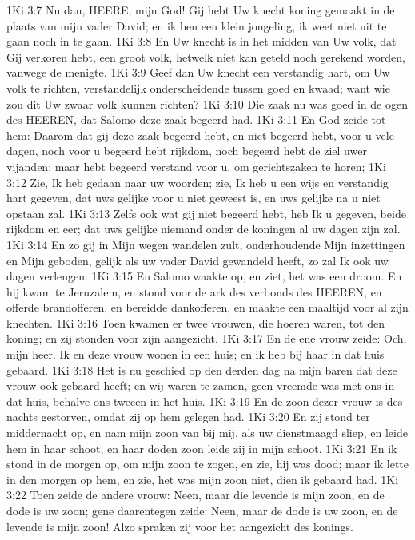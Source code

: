 1Ki 3:7  Nu dan, HEERE, mijn God! Gij hebt Uw knecht koning gemaakt in de plaats van mijn vader David; en ik ben een klein jongeling, ik weet niet uit te gaan noch in te gaan.
1Ki 3:8  En Uw knecht is in het midden van Uw volk, dat Gij verkoren hebt, een groot volk, hetwelk niet kan geteld noch gerekend worden, vanwege de menigte.
1Ki 3:9  Geef dan Uw knecht een verstandig hart, om Uw volk te richten, verstandelijk onderscheidende tussen goed en kwaad; want wie zou dit Uw zwaar volk kunnen richten?
1Ki 3:10  Die zaak nu was goed in de ogen des HEEREN, dat Salomo deze zaak begeerd had.
1Ki 3:11  En God zeide tot hem: Daarom dat gij deze zaak begeerd hebt, en niet begeerd hebt, voor u vele dagen, noch voor u begeerd hebt rijkdom, noch begeerd hebt de ziel uwer vijanden; maar hebt begeerd verstand voor u, om gerichtszaken te horen;
1Ki 3:12  Zie, Ik heb gedaan naar uw woorden; zie, Ik heb u een wijs en verstandig hart gegeven, dat uws gelijke voor u niet geweest is, en uws gelijke na u niet opstaan zal.
1Ki 3:13  Zelfs ook wat gij niet begeerd hebt, heb Ik u gegeven, beide rijkdom en eer; dat uws gelijke niemand onder de koningen al uw dagen zijn zal.
1Ki 3:14  En zo gij in Mijn wegen wandelen zult, onderhoudende Mijn inzettingen en Mijn geboden, gelijk als uw vader David gewandeld heeft, zo zal Ik ook uw dagen verlengen.
1Ki 3:15  En Salomo waakte op, en ziet, het was een droom. En hij kwam te Jeruzalem, en stond voor de ark des verbonds des HEEREN, en offerde brandofferen, en bereidde dankofferen, en maakte een maaltijd voor al zijn knechten.
1Ki 3:16  Toen kwamen er twee vrouwen, die hoeren waren, tot den koning; en zij stonden voor zijn aangezicht.
1Ki 3:17  En de ene vrouw zeide: Och, mijn heer. Ik en deze vrouw wonen in een huis; en ik heb bij haar in dat huis gebaard.
1Ki 3:18  Het is nu geschied op den derden dag na mijn baren dat deze vrouw ook gebaard heeft; en wij waren te zamen, geen vreemde was met ons in dat huis, behalve ons tweeen in het huis.
1Ki 3:19  En de zoon dezer vrouw is des nachts gestorven, omdat zij op hem gelegen had.
1Ki 3:20  En zij stond ter middernacht op, en nam mijn zoon van bij mij, als uw dienstmaagd sliep, en leide hem in haar schoot, en haar doden zoon leide zij in mijn schoot.
1Ki 3:21  En ik stond in de morgen op, om mijn zoon te zogen, en zie, hij was dood; maar ik lette in den morgen op hem, en zie, het was mijn zoon niet, dien ik gebaard had.
1Ki 3:22  Toen zeide de andere vrouw: Neen, maar die levende is mijn zoon, en de dode is uw zoon; gene daarentegen zeide: Neen, maar de dode is uw zoon, en de levende is mijn zoon! Alzo spraken zij voor het aangezicht des konings.
